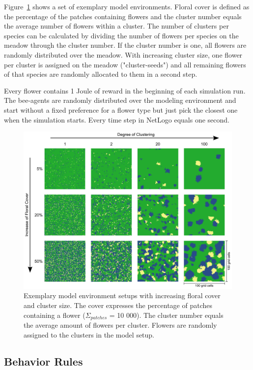 Figure~\ref{fig:cluster} shows a set of exemplary model environments. Floral cover is defined as the percentage of the patches containing flowers and the cluster number equals the average number of flowers within a cluster. The number of clusters per species can be calculated by dividing the number of flowers per species on the meadow through the cluster number. If the cluster number is one, all flowers are randomly distributed over the meadow. With increasing cluster size, one flower per cluster is assigned on the meadow ("cluster-seeds") and all remaining flowers of that species are randomly allocated to them in a second step.

Every flower contains 1 Joule of reward in the beginning of each simulation run. The bee-agents are randomly distributed over the modeling environment and start without a fixed preference for a flower type but just pick the closest one when the simulation starts. Every time step in NetLogo equals one second. 


\begin{figure} [!ht] %
	\centering
	\includegraphics[width=14cm]{Images/cluster}
	\caption{ Exemplary model environment setups with increasing floral cover and cluster size. The cover expresses the percentage of patches containing a flower ($\Sigma_{patches}$ = 10 000). The cluster number equals the average amount of flowers per cluster. Flowers are randomly assigned to the clusters in the model setup. }
	\label{fig:cluster}
\end{figure}


\subsection*{Behavior Rules}

